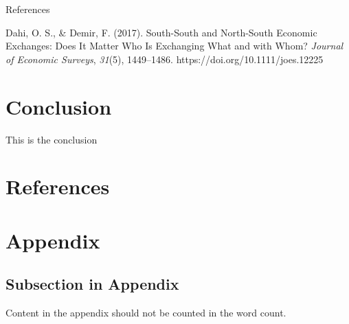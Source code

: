 \documentclass[12pt]{article}%
\begin{document}
References

Dahi, O. S., \& Demir, F. (2017). South-South and North-South Economic
Exchanges: Does It Matter Who Is Exchanging What and with Whom?
\emph{Journal of Economic Surveys}, \emph{31}(5), 1449--1486.
https://doi.org/10.1111/joes.12225

%
\section{Conclusion}%
\label{sec:Conclusion}%
This is the conclusion

%
\newpage%
\section{References}%
\label{sec:References}%
\printbibliography

%
\newpage%
\section{Appendix}%
\label{sec:Appendix}%
\subsection{Subsection in Appendix}%
\label{subsec:SubsectioninAppendix}%
Content in the appendix should not be counted in the word count.

%
\end{document}
